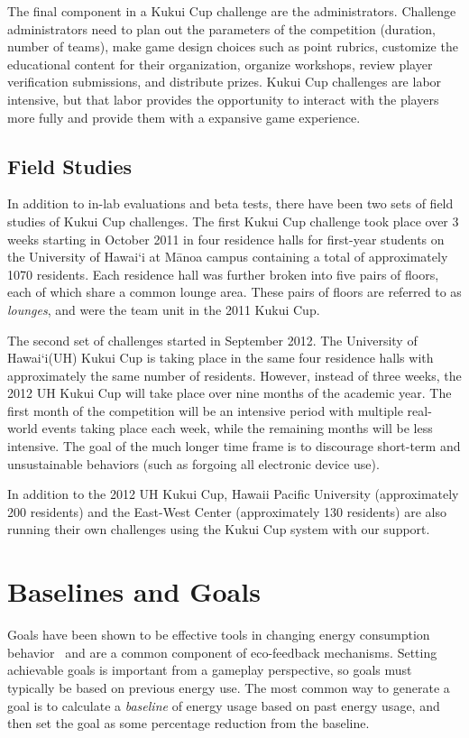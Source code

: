 \documentclass{sigchi}
\newcommand{\Hawaii}{Hawai`i\xspace}
\newcommand{\Manoa}{M\=anoa\xspace}
\begin{document}
The final component in a Kukui Cup challenge are the administrators. Challenge administrators need to plan out the parameters of the competition (duration, number of teams), make game design choices such as point rubrics, customize the educational content for their organization, organize workshops, review player verification submissions, and distribute prizes. Kukui Cup challenges are labor intensive, but that labor provides the opportunity to interact with the players more fully and provide them with a expansive game experience.

\subsection{Field Studies}

In addition to in-lab evaluations and beta tests, there have been two sets of field studies of Kukui Cup challenges. The first Kukui Cup challenge took place over 3 weeks starting in October 2011 in four residence halls for first-year students on the University of \Hawaii at \Manoa campus containing a total of approximately 1070 residents. Each residence hall was further broken into five pairs of floors, each of which share a common lounge area. These pairs of floors are referred to as \emph{lounges}, and were the team unit in the 2011 Kukui Cup.

The second set of challenges started in September 2012. The University of \Hawaii (UH) Kukui Cup is taking place in the same four residence halls with approximately the same number of residents. However, instead of three weeks, the 2012 UH Kukui Cup will take place over nine months of the academic year. The first month of the competition will be an intensive period with multiple real-world events taking place each week, while the remaining months will be less intensive. The goal of the much longer time frame is to discourage short-term and unsustainable behaviors (such as forgoing all electronic device use). 

In addition to the 2012 UH Kukui Cup, Hawaii Pacific University (approximately 200 residents) and the East-West Center (approximately 130 residents) are also running their own challenges using the Kukui Cup system with our support.

\section{Baselines and Goals}
\label{sec:goals-baselines}

Goals have been shown to be effective tools in changing energy consumption behavior~\cite{Becker78, Houwelingen89} and are a common component of eco-feedback mechanisms. Setting achievable goals is important from a gameplay perspective, so goals must typically be based on previous energy use. The most common way to generate a goal is to calculate a \emph{baseline} of energy usage based on past energy usage, and then set the goal as some percentage reduction from the baseline.
\end{document}
